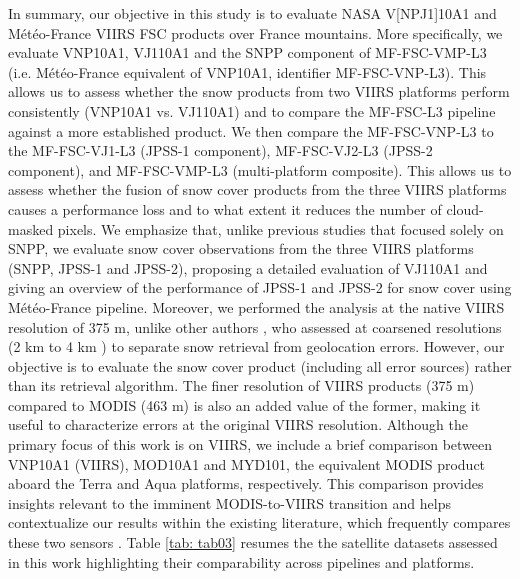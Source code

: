 \documentclass[tc, manuscript]{copernicus}
\begin{document}
In summary, our objective in this study is to evaluate NASA V[NP\textbar J1]10A1 and Météo-France VIIRS FSC products over France mountains. More specifically, we evaluate VNP10A1, VJ110A1 and the SNPP component of MF-FSC-VMP-L3 (i.e. Météo-France equivalent of VNP10A1, identifier MF-FSC-VNP-L3). This allows us to assess whether the snow products from two VIIRS platforms perform consistently (VNP10A1 vs. VJ110A1) and to compare the MF-FSC-L3 pipeline against a more established product. We then compare the MF-FSC-VNP-L3 to the MF-FSC-VJ1-L3 (JPSS-1 component), MF-FSC-VJ2-L3 (JPSS-2 component), and MF-FSC-VMP-L3 (multi-platform composite). This allows us to assess whether the fusion of snow cover products from the three VIIRS platforms causes a performance loss and to what extent it reduces the number of cloud-masked pixels. We emphasize that, unlike previous studies \citep{stillinger_landsat_2023,schwaizer2020SnowCoverExtentb,jacques-hamilton_measurement_2025} that focused solely on SNPP, we evaluate snow cover observations from the three VIIRS platforms (SNPP, JPSS-1 and JPSS-2), proposing a detailed evaluation of VJ110A1 and giving an overview of the performance of JPSS-1 and JPSS-2 for snow cover using Météo-France pipeline. Moreover, we performed the analysis at the native VIIRS resolution of 375 m, unlike other authors \citep{rittger_evaluation_2021, stillinger_landsat_2023}, who assessed at coarsened resolutions (2 km \citep{stillinger_landsat_2023} to 4 km \citep{rittger_evaluation_2021}) to separate snow retrieval from geolocation errors. However, our objective is to evaluate the snow cover product (including all error sources) rather than its retrieval algorithm. The finer resolution of VIIRS products (375 m) compared to MODIS (463 m) is also an added value of the former, making it useful to characterize errors at the original VIIRS resolution. Although the primary focus of this work is on VIIRS, we include a brief comparison between VNP10A1 (VIIRS), MOD10A1 and MYD101, the equivalent MODIS product aboard the Terra and Aqua platforms, respectively. This comparison provides insights relevant to the imminent MODIS-to-VIIRS transition and helps contextualize our results within the existing literature, which frequently compares these two sensors \citep{thapa_cross-comparison_2019, riggs_continuity_2020, zhang_comparative_2020, hall_evaluation_2019, stillinger_landsat_2023}. Table \ref{tab: tab03} resumes the the satellite datasets assessed in this work highlighting their comparability across pipelines and platforms.
\end{document}
